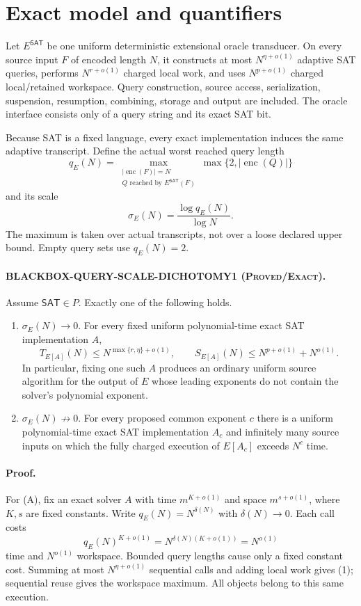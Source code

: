 \documentclass[11pt]{article}
\newcommand{\SAT}{\mathsf{SAT}}
\newcommand{\status}[1]{\textsc{#1}}
\begin{document}
\section{Exact model and quantifiers}

Let $E^{\SAT}$ be one uniform deterministic extensional oracle transducer.
On every source input $F$ of encoded length $N$, it constructs at most
$N^{\eta+o(1)}$ adaptive SAT queries, performs $N^{r+o(1)}$ charged local
work, and uses $N^{p+o(1)}$ charged local/retained workspace.  Query
construction, source access, serialization, suspension, resumption,
combining, storage and output are included.  The oracle interface consists
only of a query string and its exact SAT bit.

Because SAT is a fixed language, every exact implementation induces the same
adaptive transcript.  Define the actual worst reached query length
\[
 q_E(N)=\max_{\substack{|\operatorname{enc}(F)|=N\\
                        Q\text{ reached by }E^{\SAT}(F)}}
       \max\{2,|\operatorname{enc}(Q)|\}
\]
and its scale
\[
 \sigma_E(N)=\frac{\log q_E(N)}{\log N}.
\]
The maximum is taken over actual transcripts, not over a loose declared
upper bound.  Empty query sets use $q_E(N)=2$.

\paragraph{BLACKBOX-QUERY-SCALE-DICHOTOMY1 (\status{Proved/Exact}).}
Assume $\SAT\in P$.  Exactly one of the following holds.
\begin{enumerate}[leftmargin=1.5em,label=(\Alph*)]
\item $\sigma_E(N)\to0$.  For every fixed uniform polynomial-time exact SAT
      implementation $A$,
      \[
       T_{E[A]}(N)\le N^{\max\{r,\eta\}+o(1)},\qquad
       S_{E[A]}(N)\le N^{p+o(1)}+N^{o(1)}.
       \tag{1}
      \]
      In particular, fixing one such $A$ produces an ordinary uniform source
      algorithm for the output of $E$ whose leading exponents do not contain
      the solver's polynomial exponent.
\item $\sigma_E(N)\not\to0$.  For every proposed common exponent $c$ there is
      a uniform polynomial-time exact SAT implementation $A_c$ and infinitely
      many source inputs on which the fully charged execution of $E[A_c]$
      exceeds $N^c$ time.
\end{enumerate}

\paragraph{Proof.}
For (A), fix an exact solver $A$ with time $m^{K+o(1)}$ and space
$m^{s+o(1)}$, where $K,s$ are fixed constants.  Write
$q_E(N)=N^{\delta(N)}$ with $\delta(N)\to0$.  Each call costs
\[
 q_E(N)^{K+o(1)}=N^{\delta(N)(K+o(1))}=N^{o(1)}
\]
time and $N^{o(1)}$ workspace.  Bounded query lengths cause only a fixed
constant cost.  Summing at most $N^{\eta+o(1)}$ sequential calls and adding
local work gives (1); sequential reuse gives the workspace maximum.  All
objects belong to this same execution.
\end{document}

